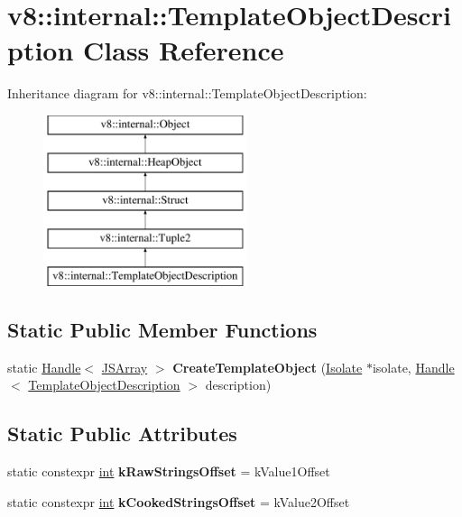 \hypertarget{classv8_1_1internal_1_1TemplateObjectDescription}{}\section{v8\+:\+:internal\+:\+:Template\+Object\+Description Class Reference}
\label{classv8_1_1internal_1_1TemplateObjectDescription}
Inheritance diagram for v8\+:\+:internal\+:\+:Template\+Object\+Description\+:\begin{figure}[H]
\begin{center}
\leavevmode
\includegraphics[height=5.000000cm]{classv8_1_1internal_1_1TemplateObjectDescription}
\end{center}
\end{figure}
\subsection*{Static Public Member Functions}
\begin{DoxyCompactItemize}
\item 
\mbox{\label{classv8_1_1internal_1_1TemplateObjectDescription_ad8ae384b2a372f6db9f42706c331bdb2}} 
static \mbox{\hyperlink{classv8_1_1internal_1_1Handle}{Handle}}$<$ \mbox{\hyperlink{classv8_1_1internal_1_1JSArray}{J\+S\+Array}} $>$ {\bfseries Create\+Template\+Object} (\mbox{\hyperlink{classv8_1_1internal_1_1Isolate}{Isolate}} $\ast$isolate, \mbox{\hyperlink{classv8_1_1internal_1_1Handle}{Handle}}$<$ \mbox{\hyperlink{classv8_1_1internal_1_1TemplateObjectDescription}{Template\+Object\+Description}} $>$ description)
\end{DoxyCompactItemize}
\subsection*{Static Public Attributes}
\begin{DoxyCompactItemize}
\item 
\mbox{\label{classv8_1_1internal_1_1TemplateObjectDescription_a8ca7b8bf38df2dfd846730cd70c8e1cf}} 
static constexpr \mbox{\hyperlink{classint}{int}} {\bfseries k\+Raw\+Strings\+Offset} = k\+Value1\+Offset
\item 
\mbox{\label{classv8_1_1internal_1_1TemplateObjectDescription_a670dfeac91f935b129afb454e01ea383}} 
static constexpr \mbox{\hyperlink{classint}{int}} {\bfseries k\+Cooked\+Strings\+Offset} = k\+Value2\+Offset
\end{DoxyCompactItemize}
